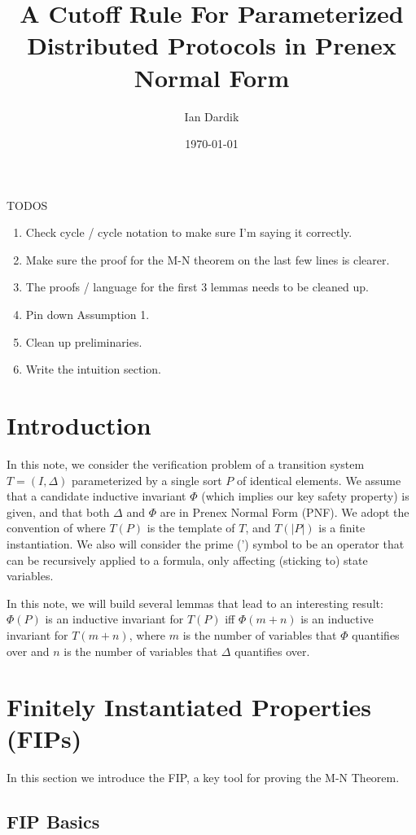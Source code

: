 \documentclass[12pt]{article}
\title{A Cutoff Rule For Parameterized Distributed Protocols in Prenex Normal Form}
\author{Ian Dardik}
\date{\today}
\theoremstyle{definition}
\theoremstyle{remark}
\begin{document}
\maketitle

\noindent TODOS
\begin{enumerate}
  \item Check cycle / cycle notation to make sure I'm saying it correctly.
  \item Make sure the proof for the M-N theorem on the last few lines is clearer.
  \item The proofs / language for the first 3 lemmas needs to be cleaned up.
  \item Pin down Assumption 1.
  \item Clean up preliminaries.
  \item Write the intuition section.
\end{enumerate}

\section{Introduction}
In this note, we consider the verification problem of a transition system $T=(I,\Delta)$ parameterized by a single sort $P$ of identical elements.  We assume that a candidate inductive invariant $\Phi$ (which implies our key safety property) is given, and that both $\Delta$ and $\Phi$ are in Prenex Normal Form (PNF).  We adopt the convention of \cite{goel2021symmetry} where $T(P)$ is the template of $T$, and $T(|P|)$ is a finite instantiation.  We also will consider the prime (') symbol to be an operator that can be recursively applied to a formula, only affecting (sticking to) state variables.

In this note, we will build several lemmas that lead to an interesting result: $\Phi(P)$ is an inductive invariant for $T(P)$ iff $\Phi(m+n)$ is an inductive invariant for $T(m+n)$, where $m$ is the number of variables that $\Phi$ quantifies over and $n$ is the number of variables that $\Delta$ quantifies over.


\section{Finitely Instantiated Properties (FIPs)}
In this section we introduce the FIP, a key tool for proving the M-N Theorem.

\subsection{FIP Basics}
\end{document}
